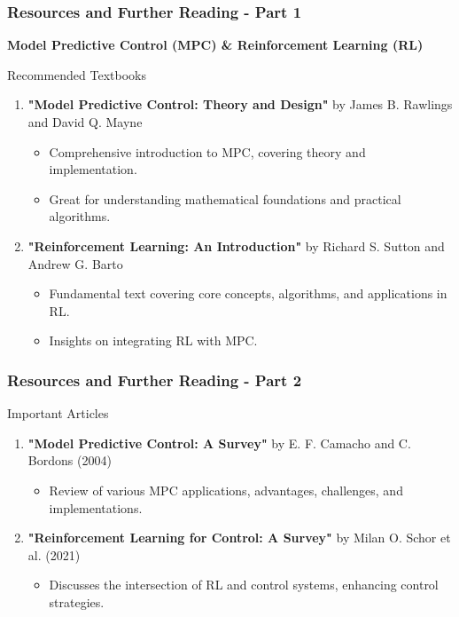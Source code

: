 \documentclass[aspectratio=169]{beamer}
\begin{document}
\begin{frame}[fragile]
    \frametitle{Resources and Further Reading - Part 1}
    \textbf{Model Predictive Control (MPC) \& Reinforcement Learning (RL)}

    \begin{block}{Recommended Textbooks}
        \begin{enumerate}
            \item \textbf{"Model Predictive Control: Theory and Design"} by James B. Rawlings and David Q. Mayne 
            \begin{itemize}
                \item Comprehensive introduction to MPC, covering theory and implementation.
                \item Great for understanding mathematical foundations and practical algorithms.
            \end{itemize}
            
            \item \textbf{"Reinforcement Learning: An Introduction"} by Richard S. Sutton and Andrew G. Barto 
            \begin{itemize}
                \item Fundamental text covering core concepts, algorithms, and applications in RL.
                \item Insights on integrating RL with MPC.
            \end{itemize}
        \end{enumerate}
    \end{block}
\end{frame}

\begin{frame}[fragile]
    \frametitle{Resources and Further Reading - Part 2}
    
    \begin{block}{Important Articles}
        \begin{enumerate}
            \item \textbf{"Model Predictive Control: A Survey"} by E. F. Camacho and C. Bordons (2004)
            \begin{itemize}
                \item Review of various MPC applications, advantages, challenges, and implementations.
            \end{itemize}

            \item \textbf{"Reinforcement Learning for Control: A Survey"} by Milan O. Schor et al. (2021)
            \begin{itemize}
                \item Discusses the intersection of RL and control systems, enhancing control strategies.
            \end{itemize}
        \end{enumerate}
    \end{block}
\end{frame}
\end{document}
